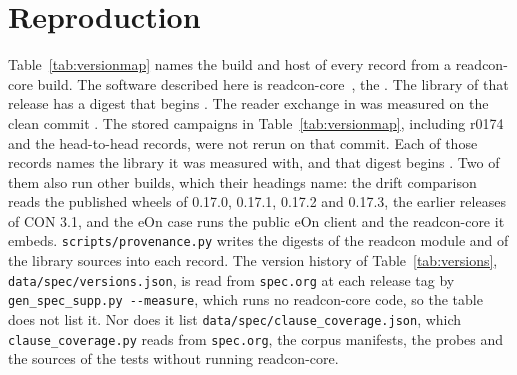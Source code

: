 \documentclass[preprint,12pt]{elsarticle}
\begin{document}
\FloatBarrier \section{Reproduction}\label{sec:supp-repro} Table~\ref{tab:versionmap} names the build and host of every record from a readcon-core build.
The software described here is readcon-core~\readconversion{}, the \readconcommitrole{} \texttt{\readconcommitshort}.
The library of that release has a digest that begins \texttt{\readcondigest}.
The reader exchange in  was measured on the clean commit \texttt{\rcHostCommit}.
The stored campaigns in Table~\ref{tab:versionmap}, including r0174 and the head-to-head records, were not rerun on that commit.
Each of those records names the library it was measured with, and that digest begins \texttt{\readconrecorddigest}.
Two of them also run other builds, which their headings name: the drift comparison reads the published wheels of 0.17.0, 0.17.1, 0.17.2 and 0.17.3, the earlier releases of CON 3.1, and the eOn case runs the public eOn client and the readcon-core it embeds.
\texttt{scripts/provenance.py} writes the digests of the readcon module and of the library sources into each record.
The version history of Table~\ref{tab:versions}, \texttt{data/\allowbreak spec/\allowbreak versions.json}, is read from \texttt{spec.org} at each release tag by \texttt{gen\_spec\_supp.py -{}-measure}, which runs no readcon-core code, so the table does not list it.
Nor does it list \texttt{data/\allowbreak spec/\allowbreak clause\_coverage.json}, which \texttt{clause\_coverage.py} reads from \texttt{spec.org}, the corpus manifests, the probes and the sources of the tests without running readcon-core.


\end{document}
